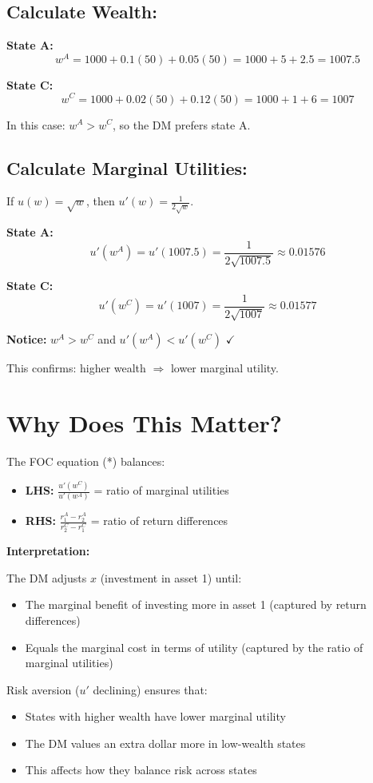 \documentclass[12pt]{article}
\begin{document}
\subsection*{Calculate Wealth:}

\textbf{State A:}
$$w^A = 1000 + 0.1(50) + 0.05(50) = 1000 + 5 + 2.5 = 1007.5$$

\textbf{State C:}
$$w^C = 1000 + 0.02(50) + 0.12(50) = 1000 + 1 + 6 = 1007$$

In this case: $w^A > w^C$, so the DM prefers state A.

\subsection*{Calculate Marginal Utilities:}

If $u(w) = \sqrt{w}$, then $u'(w) = \frac{1}{2\sqrt{w}}$.

\textbf{State A:}
$$u'(w^A) = u'(1007.5) = \frac{1}{2\sqrt{1007.5}} \approx 0.01576$$

\textbf{State C:}
$$u'(w^C) = u'(1007) = \frac{1}{2\sqrt{1007}} \approx 0.01577$$

\textbf{Notice:} $w^A > w^C$ and $u'(w^A) < u'(w^C)$ $\checkmark$

This confirms: higher wealth $\Rightarrow$ lower marginal utility.

\section*{Why Does This Matter?}

The FOC equation (*) balances:
\begin{itemize}
    \item \textbf{LHS:} $\frac{u'(w^C)}{u'(w^A)}$ = ratio of marginal utilities
    \item \textbf{RHS:} $\frac{r_1^A - r_2^A}{r_2^C - r_1^C}$ = ratio of return differences
\end{itemize}

\textbf{Interpretation:}

The DM adjusts $x$ (investment in asset 1) until:
\begin{itemize}
    \item The marginal benefit of investing more in asset 1 (captured by return differences)
    \item Equals the marginal cost in terms of utility (captured by the ratio of marginal utilities)
\end{itemize}

Risk aversion ($u'$ declining) ensures that:
\begin{itemize}
    \item States with higher wealth have lower marginal utility
    \item The DM values an extra dollar more in low-wealth states
    \item This affects how they balance risk across states
\end{itemize}
\end{document}
